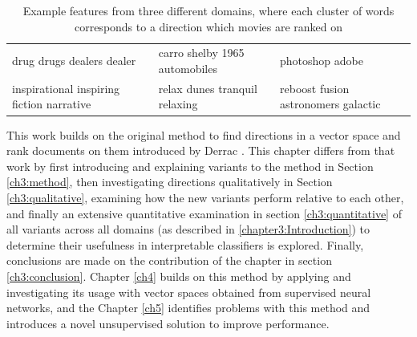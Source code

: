 \begin{table}[]
\begin{tabular}{lll}
		drug drugs dealers dealer                                   & carro shelby 1965 automobiles        & photoshop adobe                      \\
		inspirational inspiring fiction narrative                   & relax dunes tranquil relaxing        & reboost fusion astronomers galactic 
	\end{tabular}  
	\caption{Example features from three different domains, where each cluster of words corresponds to a direction which movies are ranked on}\label{ch3:ExampleRep}    
\end{table}   


This work builds on the original method to find directions in a vector space and rank documents on them introduced by Derrac \cite {Derrac2015}. This chapter differs from that work by first introducing and explaining variants to the method in Section \ref{ch3:method}, then investigating directions qualitatively in Section \ref{ch3:qualitative}, examining how the new variants perform relative to each other, and finally an extensive quantitative examination in section \ref{ch3:quantitative} of all variants across all domains (as described in \ref{chapter3:Introduction}) to determine their usefulness in interpretable classifiers is explored.  Finally, conclusions are made on the contribution of the chapter in section \ref{ch3:conclusion}. Chapter \ref{ch4} builds on this method by applying and investigating its usage with vector spaces obtained from supervised neural networks, and the Chapter \ref{ch5} identifies problems with this method and introduces a novel unsupervised solution to improve performance.












